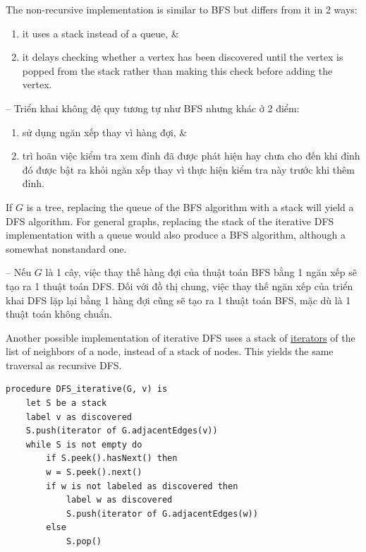 \documentclass[oneside]{book}
\begin{document}
The non-recursive implementation is similar to BFS but differs from it in 2 ways:
\begin{enumerate}
	\item it uses a stack instead of a queue, \&
	\item it delays checking whether a vertex has been discovered until the vertex is popped from the stack rather than making this check before adding the vertex.
\end{enumerate}
-- Triển khai không đệ quy tương tự như BFS nhưng khác ở 2 điểm:
\begin{enumerate}
	\item sử dụng ngăn xếp thay vì hàng đợi, \&
	\item trì hoãn việc kiểm tra xem đỉnh đã được phát hiện hay chưa cho đến khi đỉnh đó được bật ra khỏi ngăn xếp thay vì thực hiện kiểm tra này trước khi thêm đỉnh.
\end{enumerate}
If $G$ is a tree, replacing the queue of the BFS algorithm with a stack will yield a DFS algorithm. For general graphs, replacing the stack of the iterative DFS implementation with a queue would also produce a BFS algorithm, although a somewhat nonstandard one.

-- Nếu $G$ là 1 cây, việc thay thế hàng đợi của thuật toán BFS bằng 1 ngăn xếp sẽ tạo ra 1 thuật toán DFS. Đối với đồ thị chung, việc thay thế ngăn xếp của triển khai DFS lặp lại bằng 1 hàng đợi cũng sẽ tạo ra 1 thuật toán BFS, mặc dù là 1 thuật toán không chuẩn.

Another possible implementation of iterative DFS uses a stack of \href{https://en.wikipedia.org/wiki/Iterator}{iterators} of the list of neighbors of a node, instead of a stack of nodes. This yields the same traversal as recursive DFS.
\begin{verbatim}
procedure DFS_iterative(G, v) is
    let S be a stack
    label v as discovered
    S.push(iterator of G.adjacentEdges(v))
    while S is not empty do
        if S.peek().hasNext() then
        w = S.peek().next()
        if w is not labeled as discovered then
            label w as discovered
            S.push(iterator of G.adjacentEdges(w))
        else
            S.pop()
\end{verbatim}

\end{document}
